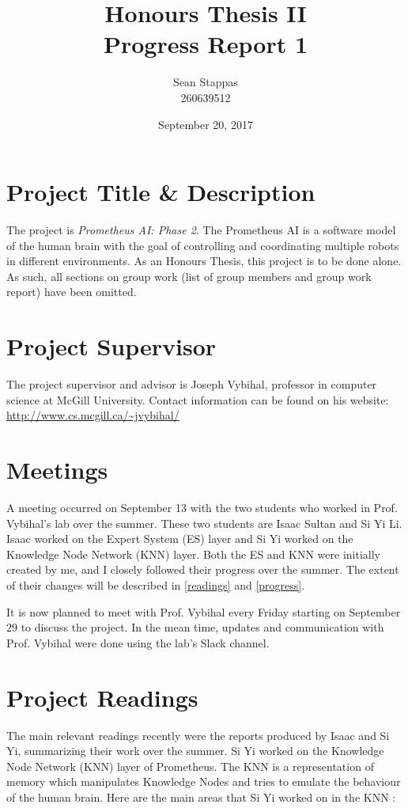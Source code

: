 \documentclass[]{article}
\title{\textbf{Honours Thesis II \\ Progress Report 1}}
\author{Sean Stappas \\ 260639512}
\date{September 20, 2017}
\begin{document}
	\maketitle
	
	\section{Project Title \& Description}
	
	The project is \emph{Prometheus AI: Phase 2}. The Prometheus AI is a software model of the human brain with the goal of controlling and coordinating multiple robots in different environments. As an Honours Thesis, this project is to be done alone. As such, all sections on group work (list of group members and group work report) have been omitted.
	
	\section{Project Supervisor}
	
	The project supervisor and advisor is Joseph Vybihal, professor in computer science at McGill University. Contact information can be found on his website: \url{http://www.cs.mcgill.ca/~jvybihal/}
	
	\section{Meetings}
	
	A meeting occurred on September 13 with the two students who worked in Prof. Vybihal's lab over the summer. These two students are Isaac Sultan and Si Yi Li. Isaac worked on the Expert System (ES) layer and Si Yi worked on the Knowledge Node Network (KNN) layer. Both the ES and KNN were initially created by me, and I closely followed their progress over the summer. The extent of their changes will be described in \autoref{readings} and \autoref{progress}.
	
	It is now planned to meet with Prof. Vybihal every Friday starting on September 29 to discuss the project. In the mean time, updates and communication with Prof. Vybihal were done using the lab's Slack channel.
	
	\section{Project Readings} \label{readings}
	
	The main relevant readings recently were the reports produced by Isaac and Si Yi, summarizing their work over the summer. Si Yi worked on the Knowledge Node Network (KNN) layer of Prometheus. The KNN is a representation of memory which manipulates Knowledge Nodes and tries to emulate the behaviour of the human brain. Here are the main areas that Si Yi worked on in the KNN \cite{siyi}:
	
\end{document}
